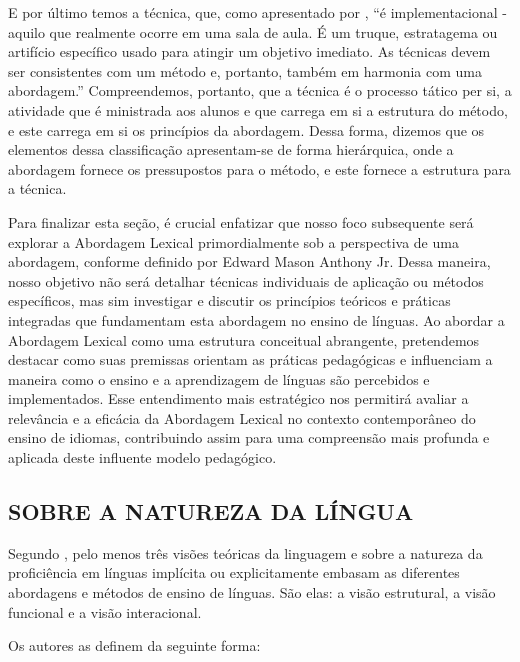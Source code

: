 E por último temos a técnica, que, como apresentado por , “é implementacional - aquilo que realmente ocorre em uma sala de aula. É um truque, estratagema ou artifício específico usado para atingir um objetivo imediato. As técnicas devem ser consistentes com um método e, portanto, também em harmonia com uma abordagem.” Compreendemos, portanto, que a técnica é o processo tático per si, a atividade que é ministrada aos alunos e que carrega em si a estrutura do método, e este carrega em si os princípios da abordagem. Dessa forma, dizemos que os elementos dessa classificação apresentam-se de forma hierárquica, onde a abordagem fornece os pressupostos para o método, e este fornece a estrutura para a técnica.

Para finalizar esta seção, é crucial enfatizar que nosso foco subsequente será explorar a Abordagem Lexical primordialmente sob a perspectiva de uma abordagem, conforme definido por Edward Mason Anthony Jr. Dessa maneira, nosso objetivo não será detalhar técnicas individuais de aplicação ou métodos específicos, mas sim investigar e discutir os princípios teóricos e práticas integradas que fundamentam esta abordagem no ensino de línguas. Ao abordar a Abordagem Lexical como uma estrutura conceitual abrangente, pretendemos destacar como suas premissas orientam as práticas pedagógicas e influenciam a maneira como o ensino e a aprendizagem de línguas são percebidos e implementados. Esse entendimento mais estratégico nos permitirá avaliar a relevância e a eficácia da Abordagem Lexical no contexto contemporâneo do ensino de idiomas, contribuindo assim para uma compreensão mais profunda e aplicada deste influente modelo pedagógico.

\subsection{SOBRE A NATUREZA DA LÍNGUA}

Segundo , pelo menos três visões teóricas da linguagem e sobre a natureza da proficiência em línguas implícita ou explicitamente embasam as diferentes abordagens e métodos de ensino de línguas. São elas: a visão estrutural, a visão funcional e a visão interacional.

Os autores as definem da seguinte forma:

